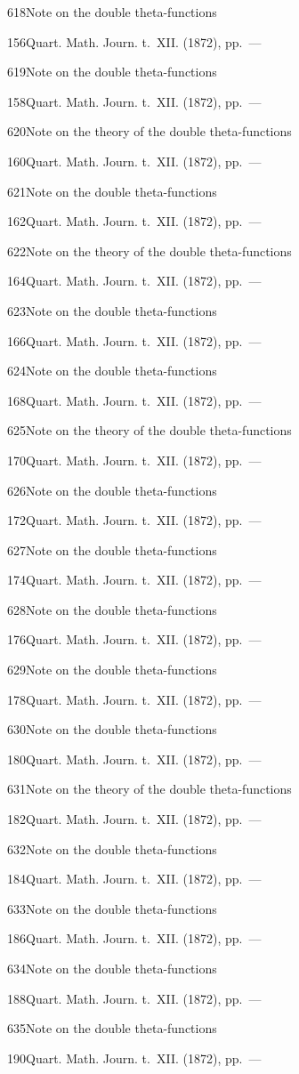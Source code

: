 \documentclass[11pt,a4paper]{book}
\providecommand{\tocentry}[2]{#1\dotfill #2\par}
\begin{document}
\tocentry{618}{Note on the double theta-functions}{156}{Quart. Math. Journ. t.~XII. (1872), pp.~---}

\tocentry{619}{Note on the double theta-functions}{158}{Quart. Math. Journ. t.~XII. (1872), pp.~---}

\tocentry{620}{Note on the theory of the double theta-functions}{160}{Quart. Math. Journ. t.~XII. (1872), pp.~---}

\tocentry{621}{Note on the double theta-functions}{162}{Quart. Math. Journ. t.~XII. (1872), pp.~---}

\tocentry{622}{Note on the theory of the double theta-functions}{164}{Quart. Math. Journ. t.~XII. (1872), pp.~---}

\tocentry{623}{Note on the double theta-functions}{166}{Quart. Math. Journ. t.~XII. (1872), pp.~---}

\tocentry{624}{Note on the double theta-functions}{168}{Quart. Math. Journ. t.~XII. (1872), pp.~---}

\tocentry{625}{Note on the theory of the double theta-functions}{170}{Quart. Math. Journ. t.~XII. (1872), pp.~---}

\tocentry{626}{Note on the double theta-functions}{172}{Quart. Math. Journ. t.~XII. (1872), pp.~---}

\newpage

\tocentry{627}{Note on the double theta-functions}{174}{Quart. Math. Journ. t.~XII. (1872), pp.~---}

\tocentry{628}{Note on the double theta-functions}{176}{Quart. Math. Journ. t.~XII. (1872), pp.~---}

\tocentry{629}{Note on the double theta-functions}{178}{Quart. Math. Journ. t.~XII. (1872), pp.~---}

\tocentry{630}{Note on the double theta-functions}{180}{Quart. Math. Journ. t.~XII. (1872), pp.~---}

\tocentry{631}{Note on the theory of the double theta-functions}{182}{Quart. Math. Journ. t.~XII. (1872), pp.~---}

\tocentry{632}{Note on the double theta-functions}{184}{Quart. Math. Journ. t.~XII. (1872), pp.~---}

\tocentry{633}{Note on the double theta-functions}{186}{Quart. Math. Journ. t.~XII. (1872), pp.~---}

\tocentry{634}{Note on the double theta-functions}{188}{Quart. Math. Journ. t.~XII. (1872), pp.~---}

\tocentry{635}{Note on the double theta-functions}{190}{Quart. Math. Journ. t.~XII. (1872), pp.~---}
\end{document}
